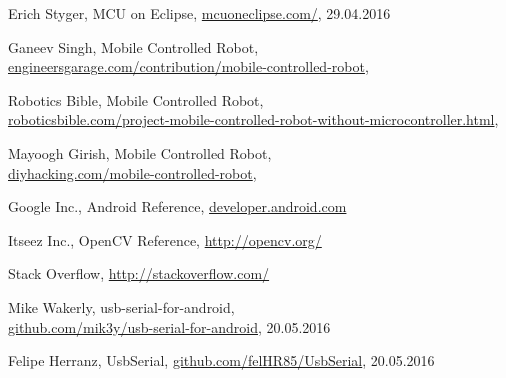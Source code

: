 \documentclass[openany]{mgr} %
\begin{document}
\begin{thebibliography}{9}

Erich Styger, MCU on Eclipse,
\url{mcuoneclipse.com/},
29.04.2016

Ganeev Singh, Mobile Controlled Robot,\\
\url{engineersgarage.com/contribution/mobile-controlled-robot},
\date{29.05.2016}

Robotics Bible, Mobile Controlled Robot,\\
\url{roboticsbible.com/project-mobile-controlled-robot-without-microcontroller.html},\\
\date{29.05.2016}

Mayoogh Girish, Mobile Controlled Robot,\\
\url{diyhacking.com/mobile-controlled-robot},
\date{29.05.2016}

Google Inc., Android Reference,
\url{developer.android.com}

Itseez Inc., OpenCV Reference,
\url{http://opencv.org/}

Stack Overflow,
\url{http://stackoverflow.com/}

Mike Wakerly, usb-serial-for-android,\\
\url{github.com/mik3y/usb-serial-for-android},
20.05.2016

Felipe Herranz, UsbSerial,
\url{github.com/felHR85/UsbSerial},
20.05.2016

\end{thebibliography}
\end{document}
